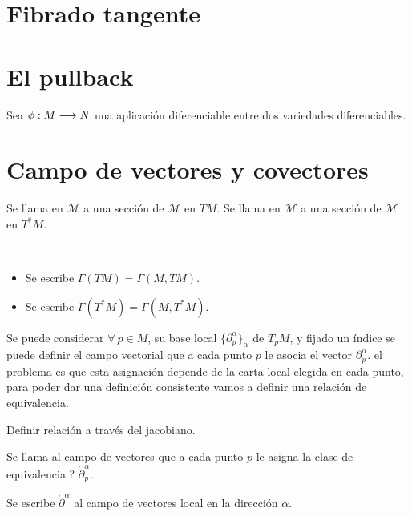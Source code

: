 






\section{Fibrado tangente}\label{sec:fibrado-tangente}


\section{El pullback}\label{sec:pullback}
Sea $\phi:M\longrightarrow N$ una aplicación diferenciable entre dos variedades diferenciables.

\section{Campo de vectores y covectores}\label{sec:campo-vectores-covectores}
\begin{definition}
  Se llama  en $\mathcal{M}$ a una sección de $\mathcal{M}$ en $TM$.
  Se llama  en $\mathcal{M}$ a una sección de $\mathcal{M}$ en $T^* M$.
\end{definition}

\begin{notation}
  \
  \begin{itemize}
    \item Se escribe $\Gamma(TM) = \Gamma(M, TM)$.
    \item Se escribe $\Gamma(T^*M) = \Gamma(M, T^*M)$.
  \end{itemize}
\end{notation}

Se puede considerar $\forall\ p\in M$, su base local $\{\partial_p^\alpha\}_\alpha$ de $T_p M$, y fijado un índice
se puede definir el campo vectorial que a cada punto $p$ le asocia el vector $\partial_p^\alpha$. el problema es que
esta asignación depende de la carta local elegida en cada punto, para poder dar una definición consistente vamos a
definir una relación de equivalencia.

\begin{exercise}
  Definir relación a través del jacobiano.
\end{exercise}

\begin{definition}
  Se llama  al campo de
  vectores que a cada punto $p$ le asigna la clase de equivalencia ? $\mathring{\partial}_p^\alpha$.
\end{definition}
\begin{notation}
  Se escribe $\mathring{\partial}^\alpha$ al campo de vectores local en la dirección $\alpha$.
\end{notation}

